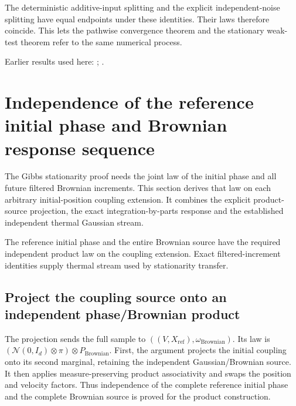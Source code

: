 \documentclass[11pt,a4paper]{report}
\begin{document}
The deterministic additive-input splitting and the explicit independent-noise splitting have equal endpoints under these identities. Their laws therefore coincide. This lets the pathwise convergence theorem and the stationary weak-test theorem refer to the same numerical process.



Earlier results used here: \cite[Section~3.13.2]{LangevinLean2026ULASC}; \cite[Section~3.33.6]{LangevinLean2026ULASC}.
\section{\texorpdfstring{Independence of the reference initial phase and Brownian response sequence}{Independence of the reference initial phase and Brownian response sequence}}
\label{proof-module-KineticLangevin-CanonicalReferenceNoise-lean}


The Gibbs stationarity proof needs the joint law of the initial phase and all future filtered Brownian increments. This section derives that law on each arbitrary initial-position coupling extension. It combines the explicit product-source projection, the exact integration-by-parts response and the established independent thermal Gaussian stream.



The reference initial phase and the entire Brownian source have the required independent product law on the coupling extension. Exact filtered-increment identities supply thermal stream used by stationarity transfer.

\subsection{\texorpdfstring{Project the coupling source onto an independent phase/\allowbreak{}Brownian product}{Project the coupling source onto an independent phase/Brownian product}}
\label{report-step-KineticLangevin-CanonicalReferenceNoise-lean-1}


The projection sends the full sample to \(((V,X_\mathrm{ref}),\omega_\mathrm{Brownian})\). Its law is \((\mathcal N(0,I_d)\otimes\pi)\otimes P_\mathrm{Brownian}\). First, the argument projects the initial coupling onto its second marginal, retaining the independent Gaussian/\allowbreak{}Brownian source. It then applies measure-preserving product associativity and swaps the position and velocity factors. Thus independence of the complete reference initial phase and the complete Brownian source is proved for the product construction.
\end{document}
